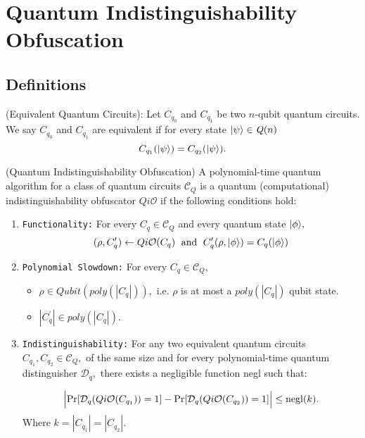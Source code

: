 
\section{Quantum Indistinguishability Obfuscation}
\label{sec:QiO-Cliffords and more}


\subsection{Definitions}
\label{sec:iO-Cliffords and more}
\begin{definition} {\rm (Equivalent Quantum Circuits):}
\label{def:eqcircuit}
Let $C_{q_0}$ and $C_{q_1}$ be two $n$-qubit quantum circuits. We say $C_{q_0}$ and $C_{q_1}$ are equivalent if for every state ${\lvert}\psi\rangle\in\mathit{Q}(n)$
$$C_{q_1}({\lvert}\psi\rangle) =C_{q_2}({\lvert}\psi\rangle).$$ 
\end{definition}


\begin{definition}\label{def:QiO} {\rm (Quantum Indistinguishability Obfuscation)}
A  polynomial-time quantum algorithm for a class of quantum circuits $\mathcal{C}_Q$ is a quantum {\rm(}computational{\rm)} indistinguishability obfuscator $Qi\mathcal{O}$  if the following conditions hold:

\begin{enumerate}
\item {\tt Functionality:}  For every $C_q\in \mathcal{C}_Q$ and every quantum state ${\lvert}\phi\rangle,$  
$$(\rho, C_q^\prime)\leftarrow Qi\mathcal{O}(C_q) \;  \mbox{ and }\; C_q^\prime(\rho,{\lvert}\phi\rangle)=C_{q}({\lvert}\phi\rangle)$$
											
\item  {\tt Polynomial Slowdown:}  For every $C_{q}\in \mathcal{C}_Q,$ 
\begin{itemize}
\item  $\rho \in \mathit{Qubit}(poly(|C_{q}|)),$ i.e. $\rho$ is at most a $poly(|C_{q}|)$ qubit state.
\item $|C_{q}^\prime| \in poly(|C_{q}|).$ 
\end{itemize}

\item {\tt Indistinguishability:} For any two equivalent quantum circuits $C_{q_1},C_{q_2}\in \mathcal{C}_Q,$ of the same size
 and for every polynomial-time quantum distinguisher $\mathcal{D}_q,$ there exists a negligible function {\rm negl} such that:

	
					$$\Big |{\rm Pr}[\mathcal{D}_q(Qi\mathcal{O}(C_{q_1}))=1]-{\rm Pr}[\mathcal{D}_q(Qi\mathcal{O}(C_{q_2}))=1] \Big |\leq  {\rm negl}(k).$$		
Where $k=|C_{q_1}|=|C_{q_2}|.$						
\end{enumerate}

\end{definition}


